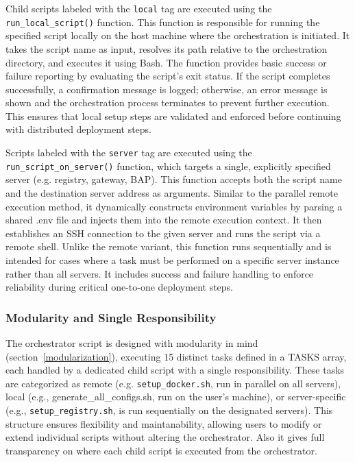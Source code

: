 Child scripts labeled with the \texttt{local} tag are executed using the \texttt{run\_local\_script()} function. This function is responsible for running the specified script locally on the host machine where the orchestration is initiated. It takes the script name as input, resolves its path relative to the orchestration directory, and executes it using Bash. The function provides basic success or failure reporting by evaluating the script's exit status. If the script completes successfully, a confirmation message is logged; otherwise, an error message is shown and the orchestration process terminates to prevent further execution. This ensures that local setup steps are validated and enforced before continuing with distributed deployment steps.

Scripts labeled with the \texttt{server} tag are executed using the \texttt{run\_script\_on\_server()} function, which targets a single, explicitly specified server (e.g. registry, gateway, BAP). This function accepts both the script name and the destination server address as arguments. Similar to the parallel remote execution method, it dynamically constructs environment variables by parsing a shared .env file and injects them into the remote execution context. It then establishes an SSH connection to the given server and runs the script via a remote shell. Unlike the remote variant, this function runs sequentially and is intended for cases where a task must be performed on a specific server instance rather than all servers. It includes success and failure handling to enforce reliability during critical one-to-one deployment steps. 

\subsubsection{Modularity and Single Responsibility}
\label{modularity_single_responsibility}
The orchestrator script is designed with modularity in mind (section~\ref{modularization}), executing 15 distinct tasks defined in a TASKS array, each handled by a dedicated child script with a single responsibility. These tasks are categorized as remote (e.g. \texttt{setup\_docker.sh}, run in parallel on all servers), local (e.g., generate\_all\_configs.sh, run on the user's machine), or server-specific (e.g., \texttt{setup\_registry.sh}, is run sequentially on the designated servers). This structure ensures flexibility and maintanability, allowing users to modify or extend individual scripts without altering the orchestrator. Also it gives full transparency on where each child script is executed from the orchestrator. 

